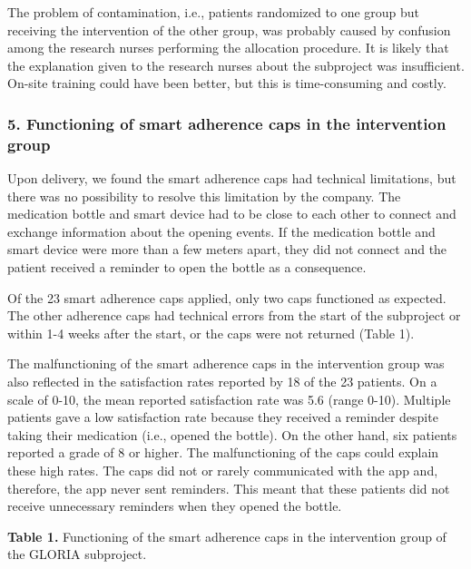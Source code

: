 \documentclass{article}
\begin{document}
The problem of contamination, i.e., patients randomized to one group but receiving the intervention of the other group, was probably caused by confusion among the research nurses performing the allocation procedure. It is likely that the explanation given to the research nurses about the subproject was insufficient. On-site training could have been better, but this is time-consuming and costly. 



\subsubsection{5. Functioning of smart adherence caps in the intervention group}

Upon delivery, we found the smart adherence caps had technical limitations, but there was no possibility to resolve this limitation by the company. The medication bottle and smart device had to be close to each other to connect and exchange information about the opening events. If the medication bottle and smart device were more than a few meters apart, they did not connect and the patient received a reminder to open the bottle as a consequence. 

Of the 23 smart adherence caps applied, only two caps functioned as expected. The other adherence caps had technical errors from the start of the subproject or within 1-4 weeks after the start, or the caps were not returned (Table 1). 

The malfunctioning of the smart adherence caps in the intervention group was also reflected in the satisfaction rates reported by 18 of the 23 patients. On a scale of 0-10, the mean reported satisfaction rate was 5.6 (range 0-10). Multiple patients gave a low satisfaction rate because they received a reminder despite taking their medication (i.e., opened the bottle). On the other hand, six patients reported a grade of 8 or higher. The malfunctioning of the caps could explain these high rates. The caps did not or rarely communicated with the app and, therefore, the app never sent reminders. This meant that these patients did not receive unnecessary reminders when they opened the bottle. 



\textbf{Table 1.} Functioning of the smart adherence caps in the intervention group of the GLORIA subproject. 
\end{document}
